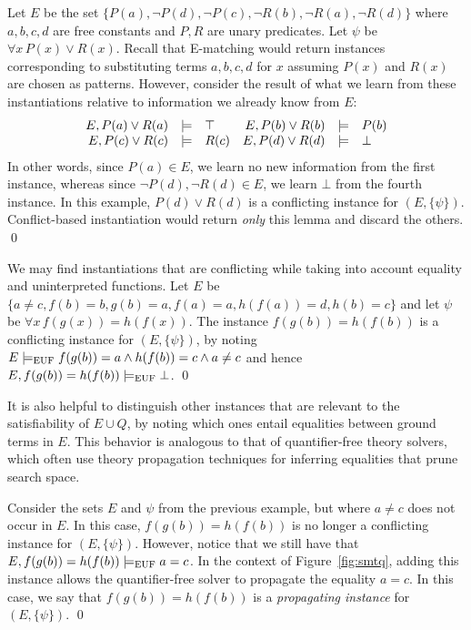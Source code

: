 \documentclass{easychair}
\begin{document}
\begin{example}
Let $E$ be the set $\{ P(a), \neg P(d), \neg P( c ), \neg R(b), \neg R(a), \neg R(d) \}$ where $a,b,c,d$ are free constants and $P,R$ are unary predicates.
Let $\psi$ be $\forall x\, P( x ) \vee R( x )$.
Recall that E-matching would return instances corresponding to substituting terms $a,b,c,d$ for $x$
assuming $P( x )$ and $R( x )$ are chosen as patterns.
However, consider the result of what we learn from these instantiations relative to information we already know from $E$:
\[
\begin{array}{rcl@{\hspace{1em}}rcl}
E, P( a ) \vee R( a ) &\models& \top &
E, P( b ) \vee R( b ) &\models& P( b ) \\
E, P( c ) \vee R( c ) &\models& R( c ) &
E, P( d ) \vee R( d ) &\models& \bot \\
\end{array}
\]
In other words, since $P( a ) \in E$, we learn no new information from the first instance,
whereas since $\neg P( d ), \neg R( d ) \in E$, we learn $\bot$ from the fourth instance.
In this example, $P( d ) \vee R( d )$ is a conflicting instance for $( E, \{ \psi \} )$.
Conflict-based instantiation would return \emph{only} this lemma and discard the others.
\qed
\end{example}
\begin{example}
We may find instantiations that are conflicting while taking into account equality and uninterpreted functions.
Let $E$ be $\{ a \neq c, f( b ) = b, g( b ) = a, f( a ) = a, h( f( a ) ) = d, h( b ) =c \}$ and let $\psi$ be
$\forall x\, f( g( x ) ) = h( f( x ) )$. 
The instance $f( g( b ) ) = h( f( b ) )$ is a conflicting instance for $( E, \{ \psi \} )$,
by noting
$E \models_\mathrm{EUF} f( g( b ) ) = a \wedge h( f( b ) ) = c \wedge a \neq c$
and hence $E, f( g( b ) ) = h( f( b ) ) \models_\mathrm{EUF} \bot$.
\qed
\end{example}
It is also helpful to distinguish other instances that are relevant to the satisfiability of $E \cup Q$,
by noting which ones entail equalities between ground terms in $E$.
This behavior is analogous to that of quantifier-free theory solvers, which often use
theory propagation techniques for inferring equalities that prune search space.
\begin{example}
Consider the sets $E$ and $\psi$ from the previous example, but where $a \neq c$ does not occur in $E$.
In this case, $f( g( b ) ) = h( f( b ) )$ is no longer a conflicting instance for $( E, \{ \psi \} )$.
However, notice that we still have that $E, f( g( b ) ) = h( f( b ) ) \models_\mathrm{EUF} a = c$.
In the context of Figure~\ref{fig:smtq}, 
adding this instance allows the quantifier-free solver to propagate the equality $a = c$.
In this case, we say that $f( g( b ) ) = h( f( b ) )$ is a \emph{propagating instance} for $( E, \{ \psi \} )$.
\qed
\end{example}
\end{document}

